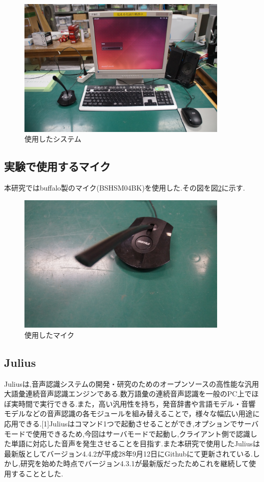 \documentclass[12pt,oneside]{sotsuken_paper}
\begin{document}
\begin{figure}[htbp]
\begin{center}
\includegraphics[width=100mm]{img/robo.JPG}
\caption{使用したシステム}
\label{fig:robot}
\end{center}
\end{figure}


\subsection{実験で使用するマイク}
本研究ではbuffalo製のマイク(BSHSM04BK)を使用した.その図を図\ref{fig:mic}に示す.


\begin{figure}[htbp]
\begin{center}
\includegraphics[width=100mm]{img/mic.JPG}
\caption{使用したマイク}
\label{fig:mic}
\end{center}
\end{figure}


\subsection{Julius}
Juliusは,音声認識システムの開発・研究のためのオープンソースの高性能な汎用大語彙連続音声認識エンジンである.数万語彙の連続音声認識を一般のPC上でほぼ実時間で実行できる.また，高い汎用性を持ち，発音辞書や言語モデル・音響モデルなどの音声認識の各モジュールを組み替えることで，様々な幅広い用途に応用できる.[1]Juliusはコマンド1つで起動させることができ,オプションでサーバモードで使用できるため,今回はサーバモードで起動し,クライアント側で認識した単語に対応した音声を発生させることを目指す.また本研究で使用したJuliusは最新版としてバージョン4.4.2が平成28年9月12日にGithubにて更新されている.しかし,研究を始めた時点でバージョン4.3.1が最新版だったためこれを継続して使用することとした.
\end{document}
